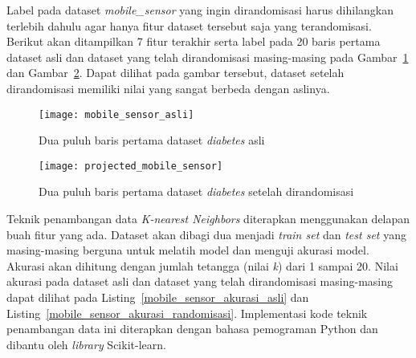 Label pada dataset \textit{mobile\_sensor} yang ingin dirandomisasi harus dihilangkan terlebih dahulu agar hanya fitur dataset tersebut saja yang terandomisasi. Berikut akan ditampilkan 7 fitur terakhir serta label pada 20 baris pertama dataset asli dan dataset yang telah dirandomisasi masing-masing pada Gambar~\ref{fig:mobile_sensor_asli} dan Gambar~\ref{fig:projected_mobile_sensor}. Dapat dilihat pada gambar tersebut, dataset setelah dirandomisasi memiliki nilai yang sangat berbeda dengan aslinya. 

\begin{figure}
	\centering
	\texttt{[image: mobile\_sensor\_asli]}
	\caption{Dua puluh baris pertama dataset \textit{diabetes} asli}
	\label{fig:mobile_sensor_asli}
\end{figure}

\begin{figure}
	\centering
	\texttt{[image: projected\_mobile\_sensor]}
	\caption{Dua puluh baris pertama dataset \textit{diabetes} setelah dirandomisasi}
	\label{fig:projected_mobile_sensor}
\end{figure}

Teknik penambangan data \textit{K-nearest Neighbors} diterapkan menggunakan delapan buah fitur yang ada. Dataset akan dibagi dua menjadi \textit{train set} dan \textit{test set} yang masing-masing berguna untuk melatih model dan menguji akurasi model. Akurasi akan dihitung dengan jumlah tetangga (nilai \textit{k}) dari 1 sampai 20. Nilai akurasi pada dataset asli dan dataset yang telah dirandomisasi masing-masing dapat dilihat pada Listing~\ref{mobile_sensor_akurasi_asli} dan Listing~\ref{mobile_sensor_akurasi_randomisasi}. Implementasi kode teknik penambangan data ini diterapkan dengan bahasa pemograman Python dan dibantu oleh \textit{library} Scikit-learn. 

